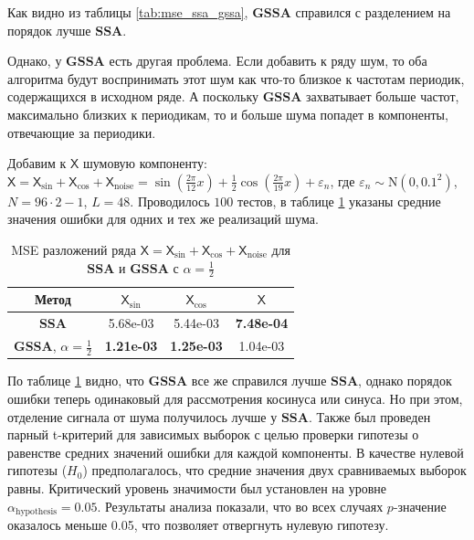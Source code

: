 \documentclass[a4paper, 11pt]{article}
\newcommand{\SSA}{\textbf{SSA}}
\newcommand{\GSSA}{\textbf{GSSA}}
\newcommand{\TS}{\mathsf{X}}
\begin{document}
Как видно из таблицы \ref{tab:mse_ssa_gssa}, $\GSSA$ справился с разделением на порядок лучше $\SSA$.

Однако, у $\GSSA$ есть другая проблема. Если добавить к ряду шум, то оба алгоритма будут воспринимать этот шум как что-то близкое к частотам периодик, содержащихся в исходном ряде. А поскольку $\GSSA$ захватывает больше частот, максимально близких к периодикам, то и больше шума попадет в компоненты, отвечающие за периодики.

Добавим к $\TS$ шумовую компоненту: $\TS = \TS_{\sin} + \TS_{\cos} + \TS_{\mathrm{noise}} =
	\sin\left(\frac{2\pi}{12}x\right) +
	\frac{1}{2}\cos\left(\frac{2\pi}{19}x\right)+
	\varepsilon_n$,
где $\varepsilon_n \sim \mathrm N(0, 0.1^2)$, $N = 96 \cdot 2 - 1$, $L = 48$.
Проводилось $100$ тестов, в таблице \ref{tab:errs_ssa_gssa} указаны средние значения ошибки для одних и тех же реализаций шума.


\begin{table}[H]
	\caption{MSE разложений ряда $\TS = \TS_{\sin} + \TS_{\cos} + \TS_{\mathrm{noise}}$ для $\SSA$ и $\GSSA$ с $\alpha = \frac{1}{2}$}
	\label{tab:errs_ssa_gssa}
	\centering
	\begin{tabular}{c|ccc}
		\hline
		Метод                                 & $\TS_{\sin}$      & $\TS_{\cos}$      & $\TS$             \\
		\hline
		\textbf{SSA}                          & 5.68e-03          & 5.44e-03          & \textbf{7.48e-04} \\
		\textbf{GSSA}, $\alpha = \frac{1}{2}$ & \textbf{1.21e-03} & \textbf{1.25e-03} & 1.04e-03          \\
		\hline
	\end{tabular}

\end{table}

По таблице \ref{tab:errs_ssa_gssa} видно, что $\GSSA$ все же справился лучше $\SSA$, однако порядок ошибки теперь одинаковый для рассмотрения косинуса или синуса. Но при этом, отделение сигнала от шума получилось лучше у $\SSA$.
Также был проведен парный t-критерий для зависимых выборок с целью проверки гипотезы о равенстве средних значений ошибки для каждой компоненты. В качестве нулевой гипотезы ($H_0$) предполагалось, что средние значения двух сравниваемых выборок равны. Критический уровень значимости был установлен на уровне $\alpha_{\mathrm{hypothesis}} = 0.05$.
Результаты анализа показали, что во всех случаях $p$-значение оказалось меньше 0.05, что позволяет отвергнуть нулевую гипотезу.
\end{document}
